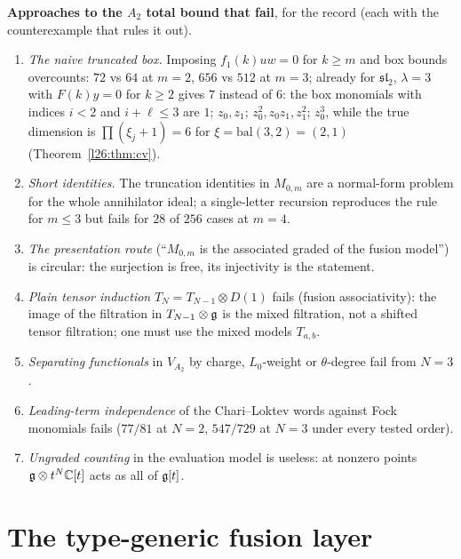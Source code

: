 \begin{warning}
\textbf{Approaches to the $A_2$ total bound that fail}, for the record (each with the counterexample that rules it out).
\begin{enumerate}
\item \emph{The naive truncated box.} Imposing $f_1(k)uw=0$ for $k\ge m$ and box bounds overcounts: $72$ vs $64$ at $m=2$,
  $656$ vs $512$ at $m=3$; already for $\mathfrak{sl}_2$, $\lambda=3$ with $F(k)y=0$ for $k\ge2$ gives $7$ instead of $6$: the
  box monomials with indices $i<2$ and $i+\ell\le3$ are $1$; $z_0,z_1$; $z_0^2,z_0z_1,z_1^2$; $z_0^3$, while the true dimension is
  $\prod(\xi_j+1)=6$ for $\xi=\mathrm{bal}(3,2)=(2,1)$ (Theorem~\ref{l26:thm:cv}).
\item \emph{Short identities.} The truncation identities in $M_{0,m}$ are a normal-form problem for the whole annihilator
  ideal; a single-letter recursion reproduces the rule for $m\le3$ but fails for $28$ of $256$ cases at $m=4$.
\item \emph{The presentation route} (``$M_{0,m}$ is the associated graded of the fusion model'') is circular: the
  surjection is free, its injectivity is the statement.
\item \emph{Plain tensor induction} $T_N=T_{N-1}\otimes D(1)$ fails (fusion associativity): the image of the filtration in
  $T_{N-1}\otimes\mathfrak g$ is the mixed filtration, not a shifted tensor filtration; one must use the mixed models
  $T_{a,b}$.
\item \emph{Separating functionals} in $V_{A_2}$ by charge, $L_0$-weight or $\theta$-degree fail from $N=3$.
\item \emph{Leading-term independence} of the Chari--Loktev words against Fock monomials fails ($77/81$ at $N=2$,
  $547/729$ at $N=3$ under every tested order).
\item \emph{Ungraded counting} in the evaluation model is useless: at nonzero points $\mathfrak g\otimes t^N{\mathbb{C}}[t]$ acts as
  all of $\mathfrak g[t]$.
\end{enumerate}
\end{warning}

\section{The type-generic fusion layer}\label{l26:sec:generic}

